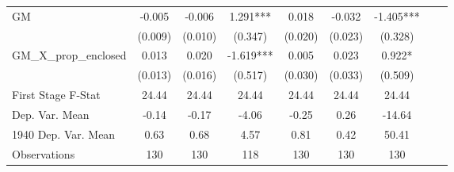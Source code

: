 \begin{tabular}{l*{8}{c}}
GM              &   -0.005   &   -0.006   &    1.291***&    0.018   &   -0.032   &   -1.405***\\
                &  (0.009)   &  (0.010)   &  (0.347)   &  (0.020)   &  (0.023)   &  (0.328)   \\
\addlinespace
GM\_X\_prop\_enclosed&    0.013   &    0.020   &   -1.619***&    0.005   &    0.023   &    0.922*  \\
                &  (0.013)   &  (0.016)   &  (0.517)   &  (0.030)   &  (0.033)   &  (0.509)   \\
\midrule
First Stage F-Stat&    24.44   &    24.44   &    24.44   &    24.44   &    24.44   &    24.44   \\
Dep. Var. Mean  &    -0.14   &    -0.17   &    -4.06   &    -0.25   &     0.26   &   -14.64   \\
1940 Dep. Var. Mean&     0.63   &     0.68   &     4.57   &     0.81   &     0.42   &    50.41   \\
Observations    &      130   &      130   &      118   &      130   &      130   &      130   \\
 \bottomrule \end{tabular}
